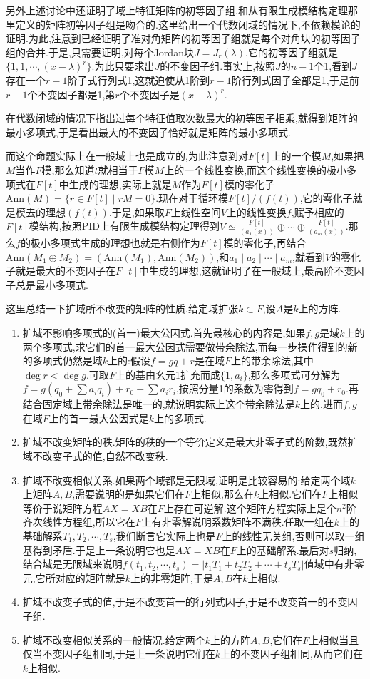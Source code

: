 另外上述讨论中还证明了域上特征矩阵的初等因子组,和从有限生成模结构定理那里定义的矩阵初等因子组是吻合的.这里给出一个代数闭域的情况下,不依赖模论的证明.为此,注意到已经证明了准对角矩阵的初等因子组就是每个对角块的初等因子组的合并.于是,只需要证明,对每个Jordan块$J=J_r(\lambda)$,它的初等因子组就是$\{1,1,\cdots,(x-\lambda)^r\}$.为此只要求出$J$的不变因子组.事实上,按照$J$的$n-1$个1,看到$J$存在一个$r-1$阶子式行列式1,这就迫使从1阶到$r-1$阶行列式因子全部是1,于是前$r-1$个不变因子都是1,第$r$个不变因子是$(x-\lambda)^r$.

在代数闭域的情况下指出过每个特征值取次数最大的初等因子相乘,就得到矩阵的最小多项式,于是看出最大的不变因子恰好就是矩阵的最小多项式.

而这个命题实际上在一般域上也是成立的,为此注意到对$F[t]$上的一个模$M$,如果把$M$当作$F$模,那么知道$t$就相当于$F$模$M$上的一个线性变换,而这个线性变换的极小多项式在$F[t]$中生成的理想,实际上就是$M$作为$F[t]$模的零化子$\mathrm{Ann}(M)=\{r\in F[t]\mid rM=0\}$.现在对于循环模$F[t]/(f(t))$,它的零化子就是模去的理想$(f(t))$,于是,如果取$F$上线性空间$V$上的线性变换$f$,赋予相应的$F[t]$模结构,按照PID上有限生成模结构定理得到$V\simeq\frac{F[t]}{(a_1(x))}\oplus\cdots\oplus\frac{F[t]}{(a_m(x))}$.那么$f$的极小多项式生成的理想也就是右侧作为$F[t]$模的零化子,再结合$\mathrm{Ann}(M_1\oplus M_2)=(\mathrm{Ann}(M_1),\mathrm{Ann}(M_2))$,和$a_1\mid a_2\mid\cdots\mid a_m$,就看到$V$的零化子就是最大的不变因子在$F[t]$中生成的理想,这就证明了在一般域上,最高阶不变因子总是最小多项式.

这里总结一下扩域所不改变的矩阵的性质.给定域扩张$k\subset F$,设$A$是$k$上的方阵.
\begin{enumerate}
	\item 扩域不影响多项式的(首一)最大公因式.首先最核心的内容是,如果$f,g$是域$k$上的两个多项式,求它们的首一最大公因式需要做带余除法,而每一步操作得到的新的多项式仍然是域$k$上的:假设$f=gq+r$是在域$F$上的带余除法,其中$\deg r<\deg g$.可取$F$上的基由幺元1扩充而成$\{1,a_i\}$,那么多项式可分解为$f=g(q_0+\sum a_iq_i)+r_0+\sum a_ir_i$,按照分量1的系数为零得到$f=gq_0+r_0$.再结合固定域上带余除法是唯一的,就说明实际上这个带余除法是$k$上的.进而$f,g$在域$F$上的首一最大公因式是$k$上的多项式.
	\item 扩域不改变矩阵的秩.矩阵的秩的一个等价定义是最大非零子式的阶数,既然扩域不改变子式的值,自然不改变秩.
	\item 扩域不改变相似关系.如果两个域都是无限域,证明是比较容易的:给定两个域$k$上矩阵$A,B$,需要说明的是如果它们在$F$上相似,那么在$k$上相似.它们在$F$上相似等价于说矩阵方程$AX=XB$在$F$上存在可逆解.这个矩阵方程实际上是个$n^2$阶齐次线性方程组,所以它在$F$上有非零解说明系数矩阵不满秩.任取一组在$k$上的基础解系$T_1,T_2,\cdots,T_s$,我们断言它实际上也是$F$上的线性无关组,否则可以取一组基得到矛盾.于是上一条说明它也是$AX=XB$在$F$上的基础解系.最后对$s$归纳,结合域是无限域来说明$f(t_1,t_2,\cdots,t_s)=|t_1T_1+t_2T_2+\cdots+t_sT_s|$值域中有非零元,它所对应的矩阵就是$k$上的非零矩阵,于是$A,B$在$k$上相似.
	\item 扩域不改变子式的值,于是不改变首一的行列式因子,于是不改变首一的不变因子组.
	\item 扩域不改变相似关系的一般情况.给定两个$k$上的方阵$A,B$,它们在$F$上相似当且仅当不变因子组相同,于是上一条说明它们在$k$上的不变因子组相同,从而它们在$k$上相似.
\end{enumerate}
\newpage
